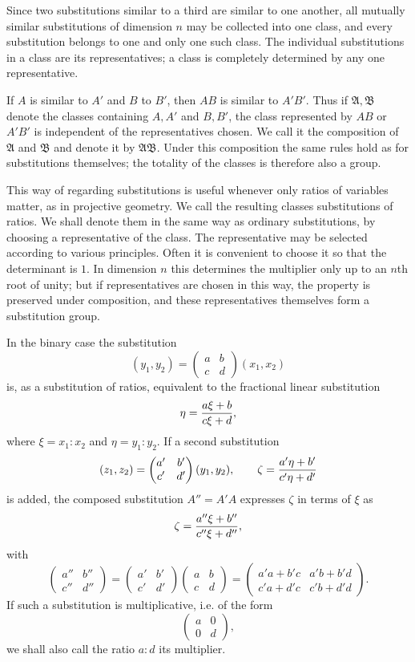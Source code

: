 \documentclass[11pt]{article}
\begin{document}
Since two substitutions similar to a third are similar to one another, all mutually similar substitutions of dimension $n$ may be collected into one class, and every substitution belongs to one and only one such class. The individual substitutions in a class are its representatives; a class is completely determined by any one representative.

If $A$ is similar to $A'$ and $B$ to $B'$, then $AB$ is similar to $A'B'$. Thus if $\mathfrak A,\mathfrak B$ denote the classes containing $A,A'$ and $B,B'$, the class represented by $AB$ or $A'B'$ is independent of the representatives chosen. We call it the composition of $\mathfrak A$ and $\mathfrak B$ and denote it by $\mathfrak A\mathfrak B$. Under this composition the same rules hold as for substitutions themselves; the totality of the classes is therefore also a group.

This way of regarding substitutions is useful whenever only ratios of variables matter, as in projective geometry. We call the resulting classes substitutions of ratios. We shall denote them in the same way as ordinary substitutions, by choosing a representative of the class. The representative may be selected according to various principles. Often it is convenient to choose it so that the determinant is $1$. In dimension $n$ this determines the multiplier only up to an $n$th root of unity; but if representatives are chosen in this way, the property is preserved under composition, and these representatives themselves form a substitution group.

In the binary case the substitution
\[
(y_1,y_2)=\begin{pmatrix}a&b\\c&d\end{pmatrix}(x_1,x_2)
\]
is, as a substitution of ratios, equivalent to the fractional linear substitution
\[
\eta={a\xi+b\over c\xi+d},
\]
where $\xi=x_1:x_2$ and $\eta=y_1:y_2$. If a second substitution
\[
(z_1,z_2)=\begin{pmatrix}a'&b'\\c'&d'\end{pmatrix}(y_1,y_2),
\qquad
\zeta={a'\eta+b'\over c'\eta+d'}
\]
is added, the composed substitution $A''=A'A$ expresses $\zeta$ in terms of $\xi$ as
\[
\zeta={a''\xi+b''\over c''\xi+d''},
\]
with
\[
\begin{pmatrix}a''&b''\\c''&d''\end{pmatrix}
=\begin{pmatrix}a'&b'\\c'&d'\end{pmatrix}
\begin{pmatrix}a&b\\c&d\end{pmatrix}
=\begin{pmatrix}a'a+b'c&a'b+b'd\\c'a+d'c&c'b+d'd\end{pmatrix}.
\]
If such a substitution is multiplicative, i.e. of the form
\[
\begin{pmatrix}a&0\\0&d\end{pmatrix},
\]
we shall also call the ratio $a:d$ its multiplier.
\end{document}
